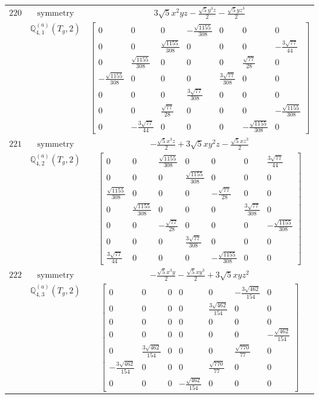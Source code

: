 \documentclass[fleqn,8pt,landscape]{jsarticle}
\begin{document}
\begin{longtable}{ccc}
$ 220 $ & $ \text{symmetry} $ & $ 3 \sqrt{5} x^{2} y z - \frac{\sqrt{5} y^{3} z}{2} - \frac{\sqrt{5} y z^{3}}{2} $ \\
$  $ & $ \mathbb{Q}_{4,1}^{(a)}(T_{g},2) $ & $ \begin{bmatrix} 0 & 0 & 0 & - \frac{\sqrt{1155}}{308} & 0 & 0 & 0 \\ 0 & 0 & \frac{\sqrt{1155}}{308} & 0 & 0 & 0 & - \frac{3 \sqrt{77}}{44} \\ 0 & \frac{\sqrt{1155}}{308} & 0 & 0 & 0 & \frac{\sqrt{77}}{28} & 0 \\ - \frac{\sqrt{1155}}{308} & 0 & 0 & 0 & \frac{3 \sqrt{77}}{308} & 0 & 0 \\ 0 & 0 & 0 & \frac{3 \sqrt{77}}{308} & 0 & 0 & 0 \\ 0 & 0 & \frac{\sqrt{77}}{28} & 0 & 0 & 0 & - \frac{\sqrt{1155}}{308} \\ 0 & - \frac{3 \sqrt{77}}{44} & 0 & 0 & 0 & - \frac{\sqrt{1155}}{308} & 0 \end{bmatrix} $ \\ \hline
$ 221 $ & $ \text{symmetry} $ & $ - \frac{\sqrt{5} x^{3} z}{2} + 3 \sqrt{5} x y^{2} z - \frac{\sqrt{5} x z^{3}}{2} $ \\
$  $ & $ \mathbb{Q}_{4,2}^{(a)}(T_{g},2) $ & $ \begin{bmatrix} 0 & 0 & \frac{\sqrt{1155}}{308} & 0 & 0 & 0 & \frac{3 \sqrt{77}}{44} \\ 0 & 0 & 0 & \frac{\sqrt{1155}}{308} & 0 & 0 & 0 \\ \frac{\sqrt{1155}}{308} & 0 & 0 & 0 & - \frac{\sqrt{77}}{28} & 0 & 0 \\ 0 & \frac{\sqrt{1155}}{308} & 0 & 0 & 0 & \frac{3 \sqrt{77}}{308} & 0 \\ 0 & 0 & - \frac{\sqrt{77}}{28} & 0 & 0 & 0 & - \frac{\sqrt{1155}}{308} \\ 0 & 0 & 0 & \frac{3 \sqrt{77}}{308} & 0 & 0 & 0 \\ \frac{3 \sqrt{77}}{44} & 0 & 0 & 0 & - \frac{\sqrt{1155}}{308} & 0 & 0 \end{bmatrix} $ \\ \hline
$ 222 $ & $ \text{symmetry} $ & $ - \frac{\sqrt{5} x^{3} y}{2} - \frac{\sqrt{5} x y^{3}}{2} + 3 \sqrt{5} x y z^{2} $ \\
$  $ & $ \mathbb{Q}_{4,3}^{(a)}(T_{g},2) $ & $ \begin{bmatrix} 0 & 0 & 0 & 0 & 0 & - \frac{3 \sqrt{462}}{154} & 0 \\ 0 & 0 & 0 & 0 & \frac{3 \sqrt{462}}{154} & 0 & 0 \\ 0 & 0 & 0 & 0 & 0 & 0 & 0 \\ 0 & 0 & 0 & 0 & 0 & 0 & - \frac{\sqrt{462}}{154} \\ 0 & \frac{3 \sqrt{462}}{154} & 0 & 0 & 0 & \frac{\sqrt{770}}{77} & 0 \\ - \frac{3 \sqrt{462}}{154} & 0 & 0 & 0 & \frac{\sqrt{770}}{77} & 0 & 0 \\ 0 & 0 & 0 & - \frac{\sqrt{462}}{154} & 0 & 0 & 0 \end{bmatrix} $ \\ \hline

\end{longtable}
\end{document}
